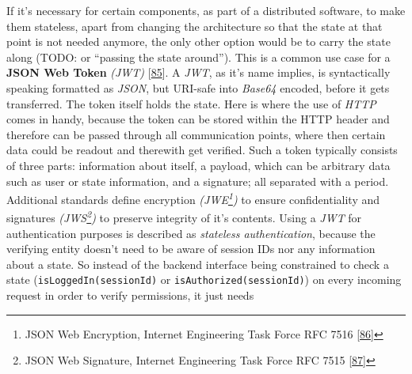 \documentclass[12pt,english,a4paper,titlepage,cleardoublepage=empty,dottedtoc]{report}
\begin{document}
If it's necessary for certain components, as part of a distributed
software, to make them stateless, apart from changing the architecture
so that the state at that point is not needed anymore, the only other
option would be to carry the state along (TODO: or ``passing the state
around''). This is a common use case for a
\textbf{\protect\hypertarget{link_jwt}{}{JSON Web Token}} \emph{(JWT)}
{[}\protect\hyperlink{ref-web_spec_json-web-token}{85}{]}. A \emph{JWT},
as it's name implies, is syntactically speaking formatted as
\emph{JSON}, but URI-safe into \emph{Base64} encoded, before it gets
transferred. The token itself holds the state. Here is where the use of
\emph{HTTP} comes in handy, because the token can be stored within the
HTTP header and therefore can be passed through all communication
points, where then certain data could be readout and therewith get
verified. Such a token typically consists of three parts: information
about itself, a payload, which can be arbitrary data such as user or
state information, and a signature; all separated with a period.
Additional standards define encryption \emph{(JWE\footnote{JSON Web
  Encryption, Internet Engineering Task Force RFC 7516
  {[}\protect\hyperlink{ref-web_spec_json-web-encryption}{86}{]}})} to
ensure confidentiality and signatures \emph{(JWS\footnote{JSON Web
  Signature, Internet Engineering Task Force RFC 7515
  {[}\protect\hyperlink{ref-web_spec_json-web-signature}{87}{]}})} to
preserve integrity of it's contents. Using a \emph{JWT} for
authentication purposes is described as \emph{stateless authentication},
because the verifying entity doesn't need to be aware of session IDs nor
any information about a state. So instead of the backend interface being
constrained to check a state (\texttt{isLoggedIn(sessionId)} or
\texttt{isAuthorized(sessionId)}) on every incoming request in order to
verify permissions, it just needs
\end{document}
